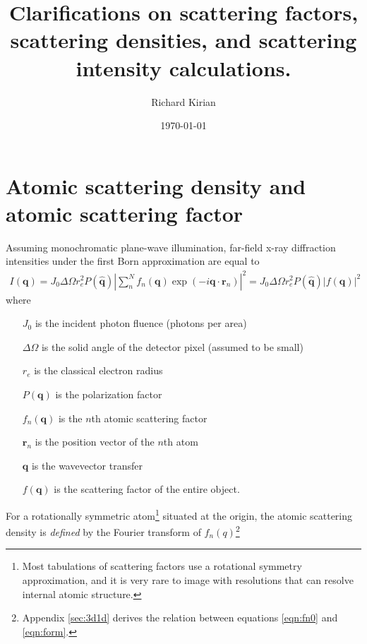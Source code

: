 \documentclass[11pt]{article}
\title{Clarifications on scattering factors, scattering densities, and scattering intensity calculations.}
\author{Richard Kirian}
\date{\today}
\renewcommand{\vec}[1]{\boldsymbol{#1}}
\newcommand{\hvec}[1]{\hat{\vec{#1}}}
\begin{document}
 

\maketitle


\section{Atomic scattering density and atomic scattering factor}

Assuming monochromatic plane-wave illumination, far-field x-ray diffraction intensities under the first Born
approximation are equal to
\begin{align}\label{eqn:qrf}
I(\vec{q}) = J_0 \Delta \Omega r_e^2 P(\hvec{q}) \left| \sum_n^N f_n(\vec{q}) \exp(-i \vec{q}\cdot\vec{r}_n)\right|^2 = 
J_0 \Delta \Omega r_e^2 P(\hvec{q}) \left| f(\vec{q})\right|^2
\end{align}
where 
\begin{itemize}
\item[$J_0$] is the incident photon fluence (photons per area)
\item[$\Delta \Omega$] is the solid angle of the detector pixel (assumed
to be small)
\item[$r_e$] is the classical electron radius
\item[$P(\vec{q})$] is the polarization factor
\item[$f_n(\vec{q})$] is the $n$th atomic scattering factor
\item[$\vec{r}_n$] is the position vector of the $n$th atom
\item[$\vec{q}$] is the wavevector transfer
\item[$f(\vec{q})$] is the scattering factor of the entire object.
\end{itemize}
For a rotationally symmetric atom\footnote{Most tabulations of scattering factors use a rotational symmetry approximation, and it is very rare to image with resolutions that can resolve internal atomic structure.} situated at the origin, the atomic scattering density is \emph{defined}
by the Fourier transform of $f_n(q)$\footnote{Appendix \ref{sec:3d1d} derives the relation between equations \ref{eqn:fn0} and \ref{eqn:form}.}
\end{document}
